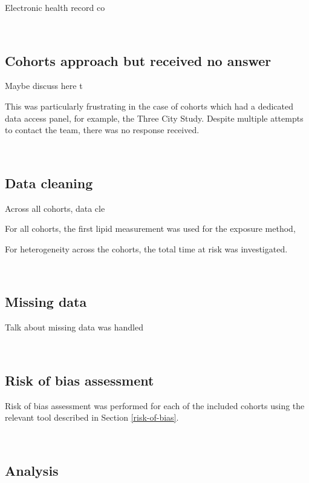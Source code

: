 \documentclass[a4paper, twoside]{templates/ociamthesis}
\begin{document}
Electronic health record co

~

\hypertarget{cohorts-approach-but-received-no-answer}{%
\subsection{Cohorts approach but received no answer}\label{cohorts-approach-but-received-no-answer}}

Maybe discuss here t

This was particularly frustrating in the case of cohorts which had a dedicated data access panel, for example, the Three City Study. Despite multiple attempts to contact the team, there was no response received.

~

\hypertarget{data-cleaning}{%
\subsection{Data cleaning}\label{data-cleaning}}

Across all cohorts, data cle

For all cohorts, the first lipid measurement was used for the exposure method,

For heterogeneity across the cohorts, the total time at risk was investigated.

~

\hypertarget{missing-data-2}{%
\subsection{Missing data}\label{missing-data-2}}

Talk about missing data was handled

~

\hypertarget{risk-of-bias-assessment}{%
\subsection{Risk of bias assessment}\label{risk-of-bias-assessment}}

Risk of bias assessment was performed for each of the included cohorts using the relevant tool described in Section \ref{risk-of-bias}.

~

\hypertarget{analysis}{%
\subsection{Analysis}\label{analysis}}
\end{document}
